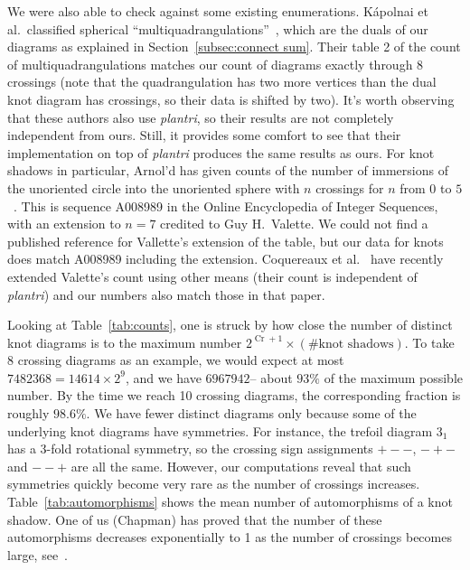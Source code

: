 \documentclass[amsmath,secnumarabic,amssymb,floatfix,nofootinbib,nobibnotes,letterpaper,11pt,tightenlines,showkeys]{revtex4}
\theoremstyle{definition}
\newcommand{\plantri}{\textit{plantri} }
\newcommand{\Cr}{\operatorname{Cr}}
\newcommand{\tref}{3_1}
\begin{document}
We were also able to check against some existing enumerations. K\'apolnai et al.\ classified spherical ``multiquadrangulations''~\cite{Kapolnai:2012hs}, which are the duals of our diagrams as explained in Section~\ref{subsec:connect sum}. Their table 2 of the count of multiquadrangulations matches our count of diagrams exactly through $8$ crossings (note that the quadrangulation has two more vertices than the dual knot diagram has crossings, so their data is shifted by two). It's worth observing that these authors also use \emph{plantri}, so their results are not completely independent from ours. Still, it provides some comfort to see that their implementation on top of \plantri produces the same results as ours. For knot shadows in particular, Arnol'd has given counts of the number of immersions of the unoriented circle into the unoriented sphere with $n$ crossings for $n$ from $0$ to $5$~\cite[page 79]{Arnold:1994wr}. This is sequence A008989 in the Online Encyclopedia of Integer Sequences, with an extension to $n=7$ credited to Guy H.\ Valette. We could not find a published reference for Vallette's extension of the table, but our data for knots does match A008989 including the extension.  Coquereaux et al.~\cite{Coquereaux:2015wv} have recently extended Valette's count using other means (their count is independent of \emph{plantri}) and our numbers also match those in that paper.

Looking at Table~\ref{tab:counts}, one is struck by how close the number of
distinct knot diagrams is to the maximum number $2^{\Cr+1} \times (\# \text{
  knot shadows})$. To take 8 crossing diagrams as an example, we would expect at
most $\num{7482368} =\num{14614} \times 2^9$, and we have $\num{6967942}$--
about $93\%$ of the maximum possible number. By the time we reach 10 crossing
diagrams, the corresponding fraction is roughly $98.6\%$. We have fewer distinct
diagrams only because some of the underlying knot diagrams have symmetries. For
instance, the trefoil diagram $\tref$ has a 3-fold rotational symmetry, so the
crossing sign assignments $+--$, $-+-$ and $--+$ are all the same. However, our
computations reveal that such symmetries quickly become very rare as the number
of crossings increases. Table~\ref{tab:automorphisms} shows the mean number of
automorphisms of a knot shadow. One of us (Chapman) has proved that the number of these automorphisms decreases exponentially to 1 as the number of crossings becomes large, see~\cite{Chapman2015knotasymp}.
\end{document}
